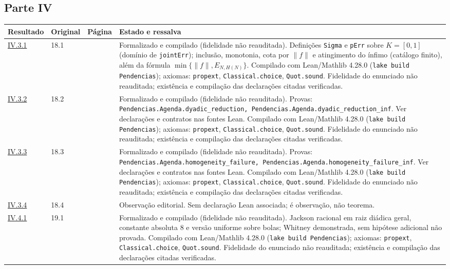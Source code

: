 \documentclass[12pt,a4paper]{article}
\theoremstyle{preciso}
\theoremstyle{definition}
\newcommand{\code}[1]{\nolinkurl{#1}}
\theoremstyle{preciso}
\theoremstyle{preciso}
\theoremstyle{preciso}
\theoremstyle{preciso}
\theoremstyle{definition}
\theoremstyle{preciso}
\theoremstyle{definition}
\theoremstyle{preciso}
\theoremstyle{preciso}
\theoremstyle{definition}
\begin{document}
\begin{singlespace}
\subsection*{Parte IV}
\small
\begin{longtable}{@{}p{.11\linewidth}p{.09\linewidth}p{.09\linewidth}p{.59\linewidth}@{}}
\toprule Resultado & Original & Página & Estado e ressalva\\\midrule\endhead
\hyperref[map:artigo_3:3.1]{IV.3.1} & 18.1 & \pageref{map:artigo_3:3.1} & Formalizado e compilado (fidelidade não reauditada). Definições \texttt{Sigma} e \texttt{pErr} sobre $K=[0,1]$ (domínio de \texttt{jointErr}); inclusão, monotonia, cota por $\|f\|$ e atingimento do ínfimo (catálogo finito), além da fórmula $\min\{\|f\|,E_{N,H(N)}\}$. Compilado com Lean/Mathlib 4.28.0 (\texttt{lake build Pendencias}); axiomas: \texttt{propext}, \texttt{Classical.choice}, \texttt{Quot.sound}. Fidelidade do enunciado não reauditada; existência e compilação das declarações citadas verificadas.\\[4pt]
\hyperref[map:artigo_3:3.2]{IV.3.2} & 18.2 & \pageref{map:artigo_3:3.2} & Formalizado e compilado (fidelidade não reauditada). Provas: \code{Pendencias.Agenda.dyadic_reduction, Pendencias.Agenda.dyadic_reduction_inf}. Ver declarações e contratos nas fontes Lean. Compilado com Lean/Mathlib 4.28.0 (\texttt{lake build Pendencias}); axiomas: \texttt{propext}, \texttt{Classical.choice}, \texttt{Quot.sound}. Fidelidade do enunciado não reauditada; existência e compilação das declarações citadas verificadas.\\[4pt]
\hyperref[map:artigo_3:3.3]{IV.3.3} & 18.3 & \pageref{map:artigo_3:3.3} & Formalizado e compilado (fidelidade não reauditada). Provas: \code{Pendencias.Agenda.homogeneity_failure, Pendencias.Agenda.homogeneity_failure_inf}. Ver declarações e contratos nas fontes Lean. Compilado com Lean/Mathlib 4.28.0 (\texttt{lake build Pendencias}); axiomas: \texttt{propext}, \texttt{Classical.choice}, \texttt{Quot.sound}. Fidelidade do enunciado não reauditada; existência e compilação das declarações citadas verificadas.\\[4pt]
\hyperref[map:artigo_3:3.4]{IV.3.4} & 18.4 & \pageref{map:artigo_3:3.4} & Observação editorial. Sem declaração Lean associada; é observação, não teorema.\\[4pt]
\hyperref[map:artigo_3:4.1]{IV.4.1} & 19.1 & \pageref{map:artigo_3:4.1} & Formalizado e compilado (fidelidade não reauditada). Jackson racional em raiz diádica geral, constante absoluta 8 e versão uniforme sobre bolas; Whitney demonstrada, sem hipótese adicional não provada. Compilado com Lean/Mathlib 4.28.0 (\texttt{lake build Pendencias}); axiomas: \texttt{propext}, \texttt{Classical.choice}, \texttt{Quot.sound}. Fidelidade do enunciado não reauditada; existência e compilação das declarações citadas verificadas.\\[4pt]

\end{longtable}
\end{singlespace}
\end{document}
